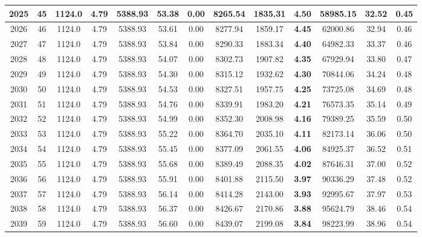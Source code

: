 {\begin{center}
\begin{tabular}[htb]{|c|c||c|c|c|c|c|c||c|c||c|c|c||}
\hline 
 2025 &  45 &  1124.0 &  4.79 &  5388.93 &  53.38 &  0.00 &  8265.54 &  1835.31 &  {\bf 4.50} &  58985.15 &  32.52 &  0.45 \\ 
\hline 
 2026 &  46 &  1124.0 &  4.79 &  5388.93 &  53.61 &  0.00 &  8277.94 &  1859.17 &  {\bf 4.45} &  62000.86 &  32.94 &  0.46 \\ 
\hline 
 2027 &  47 &  1124.0 &  4.79 &  5388.93 &  53.84 &  0.00 &  8290.33 &  1883.34 &  {\bf 4.40} &  64982.33 &  33.37 &  0.46 \\ 
\hline 
 2028 &  48 &  1124.0 &  4.79 &  5388.93 &  54.07 &  0.00 &  8302.73 &  1907.82 &  {\bf 4.35} &  67929.94 &  33.80 &  0.47 \\ 
\hline 
 2029 &  49 &  1124.0 &  4.79 &  5388.93 &  54.30 &  0.00 &  8315.12 &  1932.62 &  {\bf 4.30} &  70844.06 &  34.24 &  0.48 \\ 
\hline 
 2030 &  50 &  1124.0 &  4.79 &  5388.93 &  54.53 &  0.00 &  8327.51 &  1957.75 &  {\bf 4.25} &  73725.08 &  34.69 &  0.48 \\ 
\hline 
 2031 &  51 &  1124.0 &  4.79 &  5388.93 &  54.76 &  0.00 &  8339.91 &  1983.20 &  {\bf 4.21} &  76573.35 &  35.14 &  0.49 \\ 
\hline 
 2032 &  52 &  1124.0 &  4.79 &  5388.93 &  54.99 &  0.00 &  8352.30 &  2008.98 &  {\bf 4.16} &  79389.25 &  35.59 &  0.50 \\ 
\hline 
 2033 &  53 &  1124.0 &  4.79 &  5388.93 &  55.22 &  0.00 &  8364.70 &  2035.10 &  {\bf 4.11} &  82173.14 &  36.06 &  0.50 \\ 
\hline 
 2034 &  54 &  1124.0 &  4.79 &  5388.93 &  55.45 &  0.00 &  8377.09 &  2061.55 &  {\bf 4.06} &  84925.37 &  36.52 &  0.51 \\ 
\hline 
 2035 &  55 &  1124.0 &  4.79 &  5388.93 &  55.68 &  0.00 &  8389.49 &  2088.35 &  {\bf 4.02} &  87646.31 &  37.00 &  0.52 \\ 
\hline 
 2036 &  56 &  1124.0 &  4.79 &  5388.93 &  55.91 &  0.00 &  8401.88 &  2115.50 &  {\bf 3.97} &  90336.29 &  37.48 &  0.52 \\ 
\hline 
 2037 &  57 &  1124.0 &  4.79 &  5388.93 &  56.14 &  0.00 &  8414.28 &  2143.00 &  {\bf 3.93} &  92995.67 &  37.97 &  0.53 \\ 
\hline 
 2038 &  58 &  1124.0 &  4.79 &  5388.93 &  56.37 &  0.00 &  8426.67 &  2170.86 &  {\bf 3.88} &  95624.79 &  38.46 &  0.54 \\ 
\hline 
 2039 &  59 &  1124.0 &  4.79 &  5388.93 &  56.60 &  0.00 &  8439.07 &  2199.08 &  {\bf 3.84} &  98223.99 &  38.96 &  0.54 \\ 

\end{tabular}
\end{center}}
